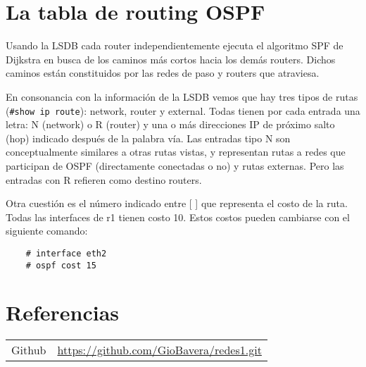 \documentclass{article}
\begin{document}
\section{La tabla de routing OSPF}
Usando la LSDB cada router independientemente ejecuta el algoritmo SPF de Dijkstra en busca de los caminos más cortos hacia los demás routers. Dichos caminos están constituidos por las redes de paso y routers que atraviesa.

En consonancia con la información de la LSDB vemos que hay tres tipos de rutas (\texttt{\#show ip route}): network,
router y external. Todas tienen por cada entrada una letra: N (network) o R (router) y una o más
direcciones IP de próximo salto (hop) indicado después de la palabra vía. Las entradas tipo N son
conceptualmente similares a otras rutas vistas, y representan rutas a redes que participan de OSPF
(directamente conectadas o no) y rutas externas. Pero las entradas con R refieren como destino
routers.    

Otra cuestión es el número indicado entre [ ] que representa el costo de la ruta. Todas las interfaces
de r1 tienen costo 10. Estos costos pueden cambiarse con el siguiente comando:

\begin{verbatim}
    # interface eth2
    # ospf cost 15
\end{verbatim}

\section{Referencias}
\begin{tabular}{ll}
Github         & \url{https://github.com/GioBavera/redes1.git} \\
\end{tabular}
\end{document}
